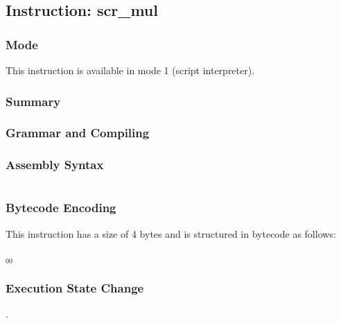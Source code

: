 \subsection{Instruction: scr\_mul}

\subsubsection{Mode}
This instruction is available in mode 1 (script interpreter).
\subsubsection{Summary}


\subsubsection{Grammar and Compiling}


\subsubsection{Assembly Syntax}

\begin{myquote}
\begin{verbatim}

\end{verbatim}
\end{myquote}

\subsubsection{Bytecode Encoding}

This instruction has a size of 4 bytes and is structured in bytecode as follows:

$_{00}$\ 

\subsubsection{Execution State Change}

.


